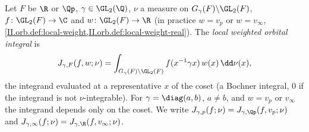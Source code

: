 Let $F$ be $\R$ or $\Qp$, $\gamma\in\GL_2(\Q)$, $\nu$ a measure on $G_\gamma(F)\backslash\GL_2(F)$, $f\colon\GL_2(F)\to\C$ and $w\colon\GL_2(F)\to\R$ (in practice
$w=v_p$ or $w=v_\infty$, \cref{II.orb.def:local-weight,II.orb.def:local-weight-real}). The \emph{local weighted orbital integral} is
\[
  J_{\gamma,F}(f,w;\nu)=\int_{G_\gamma(F)\backslash\GL_2(F)}f(x^{-1}\gamma x)\,w(x)\,\dd\nu(x),
\]
the integrand evaluated at a representative $x$ of the coset (a Bochner integral, $0$ if the integrand is not $\nu$-integrable). For
$\gamma=\diag(a,b)$, $a\neq b$, and $w=v_p$ or $v_\infty$ the integrand depends only on the coset. We write $J_{\gamma,p}(f;\nu)=J_{\gamma,\Qp}(f,v_p;\nu)$ and
$J_{\gamma,\infty}(f;\nu)=J_{\gamma,\R}(f,v_\infty;\nu)$.

